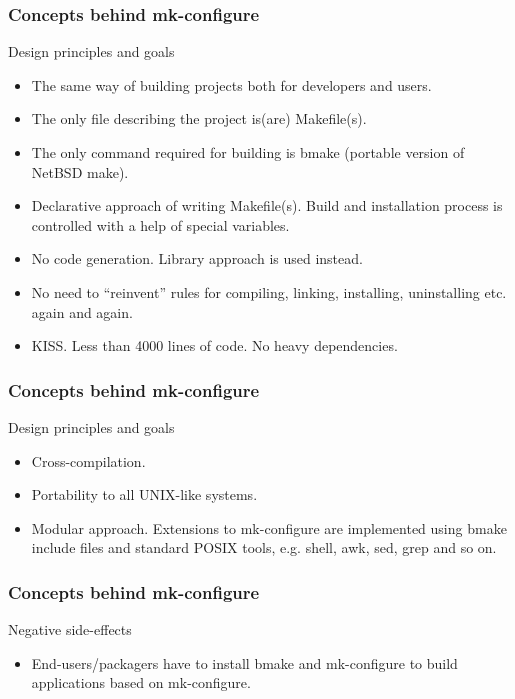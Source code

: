 \documentclass[hyperref={colorlinks=true}]{beamer}
\begin{document}
\begin{frame}
  \frametitle{Concepts behind mk-configure}
  \begin{block}{Design principles and goals}
    \begin{itemize}
    \item The same way of building projects both for developers and users.
    \item The only file describing the project is(are) Makefile(s).
    \item The only command
      required for building is bmake (portable version of NetBSD make).
    \item Declarative approach of writing Makefile(s). Build and
      installation process is controlled with a help of special
      variables.
    \item No code generation. Library approach is used instead.
    \item No need to ``reinvent'' rules for compiling, linking,
      installing, uninstalling etc. again and again.
    \item KISS. Less than 4000 lines of code.
      No heavy dependencies.
    \end{itemize}
  \end{block}
\end{frame}

\begin{frame}
  \frametitle{Concepts behind mk-configure}
  \begin{block}{Design principles and goals}
    \begin{itemize}
    \item Cross-compilation.
    \item Portability to all UNIX-like systems.
    \item Modular approach. Extensions to mk-configure are implemented
      using bmake include files and standard POSIX tools, e.g. shell,
      awk, sed, grep and so on.
    \end{itemize}
  \end{block}
\end{frame}

\begin{frame}
  \frametitle{Concepts behind mk-configure}
  \begin{block}{Negative side-effects}
    \begin{itemize}
    \item End-users/packagers have to install bmake and
      mk-configure to build applications based on mk-configure.
    \end{itemize}
  \end{block}
\end{frame}
\end{document}
